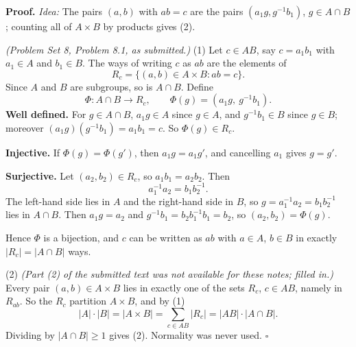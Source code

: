 \documentclass[11pt]{report}
\renewenvironment{proof}[1][Proof]{\noindent\textbf{#1.} }{\hfill$\square$\par\vspace{5pt}}
\begin{document}
\begin{proof}
\textit{Idea:} The pairs $(a, b)$ with $ab = c$ are the pairs $(a_1g, g^{-1}b_1)$, $g \in A \cap B$; counting all of $A \times B$ by products gives (2).\par
\textit{(Problem Set 8, Problem 8.1, as submitted.)} (1) Let $c \in AB$, say $c = a_1b_1$ with $a_1 \in A$ and $b_1 \in B$. The ways of writing $c$ as $ab$ are the elements of
\[ R_c = \{(a, b) \in A \times B : ab = c\}. \]
Since $A$ and $B$ are subgroups, so is $A \cap B$. Define
\[ \Phi : A \cap B \to R_c, \qquad \Phi(g) = (a_1g,\ g^{-1}b_1). \]
\textbf{Well defined.} For $g \in A \cap B$, $a_1g \in A$ since $g \in A$, and $g^{-1}b_1 \in B$ since $g \in B$; moreover $(a_1g)(g^{-1}b_1) = a_1b_1 = c$. So $\Phi(g) \in R_c$.

\textbf{Injective.} If $\Phi(g) = \Phi(g')$, then $a_1g = a_1g'$, and cancelling $a_1$ gives $g = g'$.

\textbf{Surjective.} Let $(a_2, b_2) \in R_c$, so $a_1b_1 = a_2b_2$. Then
\[ a_1^{-1}a_2 = b_1b_2^{-1}. \]
The left-hand side lies in $A$ and the right-hand side in $B$, so $g = a_1^{-1}a_2 = b_1b_2^{-1}$ lies in $A \cap B$. Then $a_1g = a_2$ and $g^{-1}b_1 = b_2b_1^{-1}b_1 = b_2$, so $(a_2, b_2) = \Phi(g)$.

Hence $\Phi$ is a bijection, and $c$ can be written as $ab$ with $a \in A$, $b \in B$ in exactly $|R_c| = |A \cap B|$ ways.

(2) %
\textit{(Part (2) of the submitted text was not available for these notes; filled in.)} Every pair $(a, b) \in A \times B$ lies in exactly one of the sets $R_c$, $c \in AB$, namely in $R_{ab}$. So the $R_c$ partition $A \times B$, and by (1)
\[ |A| \cdot |B| = |A \times B| = \sum_{c \in AB} |R_c| = |AB| \cdot |A \cap B|. \]
Dividing by $|A \cap B| \geq 1$ gives (2). Normality was never used.
\end{proof}
\end{document}
